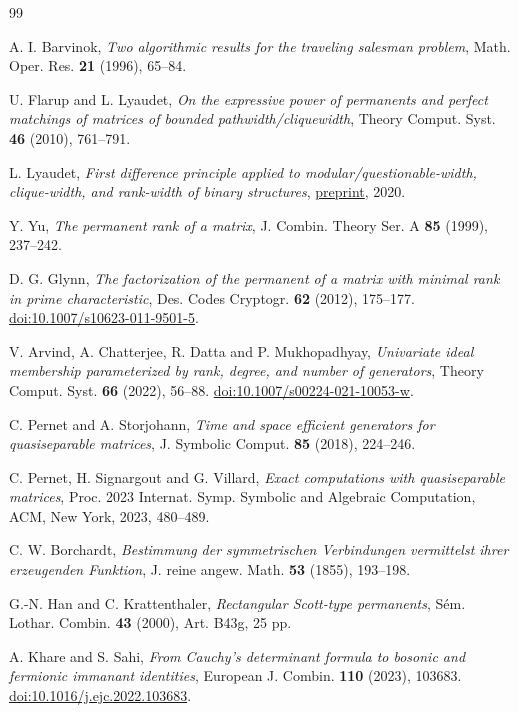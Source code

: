 \documentclass[11pt,reqno]{amsart}
\theoremstyle{remark}
\numberwithin{equation}{section}
\begin{document}
\begin{thebibliography}{99}

 A. I. Barvinok,
\emph{Two algorithmic results for the traveling salesman problem},
Math. Oper. Res. \textbf{21} (1996), 65--84.

 U. Flarup and L. Lyaudet,
\emph{On the expressive power of permanents and perfect matchings of matrices of bounded pathwidth/cliquewidth},
Theory Comput. Syst. \textbf{46} (2010), 761--791.

 L. Lyaudet,
\emph{First difference principle applied to modular/questionable-width,
clique-width, and rank-width of binary structures},
\href{https://lyaudet.eu/laurent/Publi/Journaux/LL2020LargeursStructuresBinaires/LL2020LargeursStructuresBinaires_v2.pdf}{preprint}, 2020.

 Y. Yu, \emph{The permanent rank of a matrix},
J. Combin. Theory Ser. A \textbf{85} (1999), 237--242.

 D. G. Glynn,
\emph{The factorization of the permanent of a matrix with minimal
rank in prime characteristic}, Des. Codes Cryptogr. \textbf{62}
(2012), 175--177.
\href{https://doi.org/10.1007/s10623-011-9501-5}{doi:10.1007/s10623-011-9501-5}.

 V. Arvind, A. Chatterjee, R. Datta and P. Mukhopadhyay,
\emph{Univariate ideal membership parameterized by rank, degree, and
number of generators}, Theory Comput. Syst. \textbf{66} (2022), 56--88.
\href{https://doi.org/10.1007/s00224-021-10053-w}{doi:10.1007/s00224-021-10053-w}.

 C. Pernet and A. Storjohann,
\emph{Time and space efficient generators for quasiseparable matrices},
J. Symbolic Comput. \textbf{85} (2018), 224--246.

 C. Pernet, H. Signargout and G. Villard,
\emph{Exact computations with quasiseparable matrices},
Proc. 2023 Internat. Symp. Symbolic and Algebraic Computation,
ACM, New York, 2023, 480--489.

 C. W. Borchardt,
\emph{Bestimmung der symmetrischen Verbindungen vermittelst ihrer
erzeugenden Funktion}, J. reine angew. Math. \textbf{53} (1855), 193--198.

 G.-N. Han and C. Krattenthaler,
\emph{Rectangular Scott-type permanents}, S\'em. Lothar. Combin.
\textbf{43} (2000), Art. B43g, 25 pp.

 A. Khare and S. Sahi,
\emph{From Cauchy's determinant formula to bosonic and fermionic
immanant identities}, European J. Combin. \textbf{110} (2023), 103683.
\href{https://doi.org/10.1016/j.ejc.2022.103683}{doi:10.1016/j.ejc.2022.103683}.


\end{thebibliography}
\end{document}
